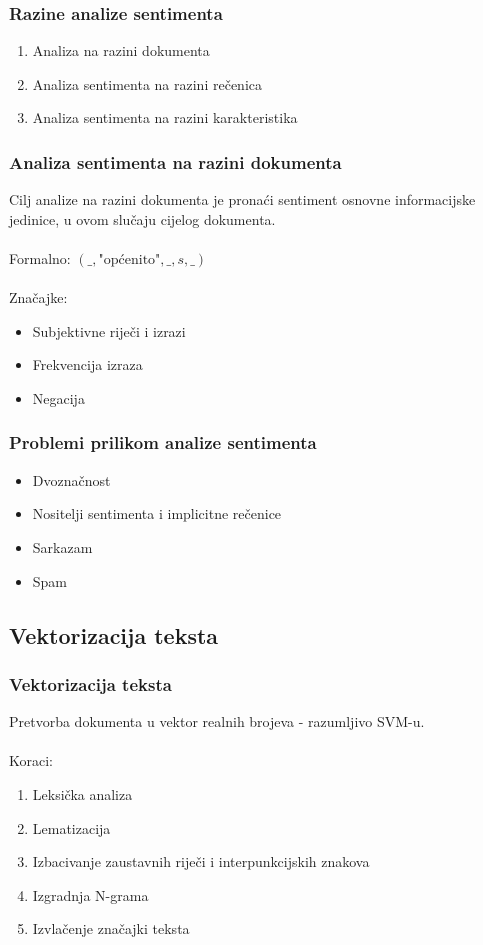 \documentclass[utf8]{beamer}
\begin{document}
\begin{frame}
\frametitle{Razine analize sentimenta}
\begin{enumerate}
\item Analiza na razini dokumenta
\item Analiza sentimenta na razini rečenica
\item Analiza sentimenta na razini karakteristika
\end{enumerate}
\end{frame}

\begin{frame}
\frametitle{Analiza sentimenta na razini dokumenta}

Cilj analize na razini dokumenta je pronaći sentiment osnovne informacijske jedinice, u ovom slučaju cijelog dokumenta. \\~\\

Formalno: $(\text{\_}, \text{"općenito"}, \text{\_}, s, \text{\_})$ \\~\\

Značajke:
\begin{itemize}
\item Subjektivne riječi i izrazi
\item Frekvencija izraza
\item Negacija
\end{itemize}
\end{frame}

\begin{frame}
\frametitle{Problemi prilikom analize sentimenta}
\begin{itemize}
\item Dvoznačnost
\item Nositelji sentimenta i implicitne rečenice
\item Sarkazam
\item Spam
\end{itemize}
\end{frame}

\subsection{Vektorizacija teksta}
\begin{frame}
\frametitle{Vektorizacija teksta}
Pretvorba dokumenta u vektor realnih brojeva - razumljivo SVM-u. \\~\\

Koraci:
\begin{enumerate}
\item Leksička analiza
\item Lematizacija
\item Izbacivanje zaustavnih riječi i interpunkcijskih znakova
\item Izgradnja N-grama
\item Izvlačenje značajki teksta
\end{enumerate}
\end{frame}
\end{document}
